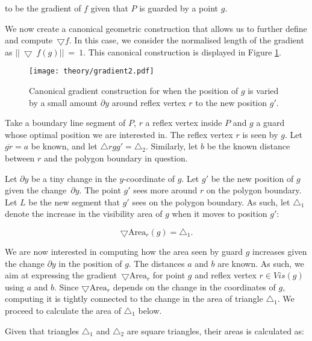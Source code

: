 to be the gradient of $f$ given that $P$ is guarded by a point $g$. 

We  now create a canonical geometric construction that allows us to further define and compute~$\bigtriangledown f$. In this case, we consider the normalised length of the gradient as $||~\bigtriangledown~f(g)||~=~1$. This canonical construction is displayed in Figure \ref{fig:gradient}. 

\begin{figure}[h!]
    \centering
    \texttt{[image: theory/gradient2.pdf]}
    \caption{Canonical gradient construction for when the position of $g$ is varied by a small amount $\partial y$ around reflex vertex $r$ to the new position $g'$.}
    \label{fig:gradient}
\end{figure}

Take a boundary line segment of $P$, $r$ a reflex vertex inside $P$ and $g$ a guard whose optimal position we are interested in. The reflex vertex $r$ is seen by $g$. Let $\overline{gr} = a$ be known, and let $\triangle rgg' = \triangle_2$. Similarly, let $b$ be the known distance between $r$ and the polygon boundary in question.


Let $\partial y$ be a tiny change in the $y$-coordinate of $g$. Let $g'$ be the new position of $g$ given the change~$\partial y$. The point $g'$ sees more around $r$ on the polygon boundary. Let $L$ be the new segment that $g'$ sees on the polygon boundary. As such, let $\triangle_1$ denote the increase in the visibility area of $g$ when it moves to position $g'$:

\begin{equation}
    \bigtriangledown \text{Area}_r(g) = \triangle_1. \label{eq:derivative}
\end{equation}

\newpage
We are now interested in computing how the area seen by guard $g$ increases given the change $\partial y$ in the position of $g$. The distances $a$ and $b$ are known. As such, we aim at expressing the gradient~$\bigtriangledown \text{Area}_r$ for point $g$ and reflex vertex $r \in \mathit{Vis}(g)$ using $a$ and $b$. Since $\bigtriangledown \text{Area}_r$ depends on the change in the coordinates of $g$, computing it is tightly connected to the change in the area of triangle $\triangle_1$. We  proceed to calculate the area of $\triangle_1$ below.

Given that triangles $\triangle_1$ and $\triangle_2$ are square triangles, their areas is calculated as:

